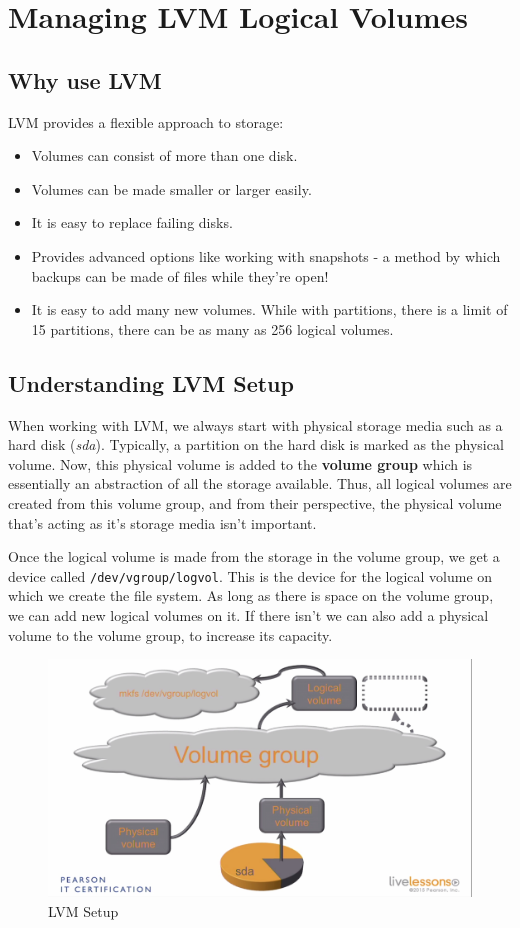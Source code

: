 \chapter{Managing LVM Logical Volumes}

\section{Why use LVM}
LVM provides a flexible approach to storage:

\vspace{-10pt}
\begin{itemize}
	\item Volumes can consist of more than one disk.
	\item Volumes can be made smaller or larger easily.
	\item It is easy to replace failing disks.
	\item Provides advanced options like working with snapshots - a method by which backups can be made of files while they're open!
	\item It is easy to add many new volumes. While with partitions, there is a limit of 15 partitions, there can be as many as 256 logical volumes. 
\end{itemize}

\section{Understanding LVM Setup}
When working with LVM, we always start with physical storage media such as a hard disk (\textit{sda}). Typically, a partition on the hard disk is marked as the physical volume. Now, this physical volume is added to the \textbf{volume group} which is essentially an abstraction of all the storage available. Thus, all logical volumes are created from this volume group, and from their perspective, the physical volume that's acting as it's storage media isn't important. 

Once the logical volume is made from the storage in the volume group, we get a device called \verb|/dev/vgroup/logvol|. This is the device for the logical volume on which we create the file system. As long as there is space on the volume group, we can add new logical volumes on it. If there isn't we can also add a physical volume to the volume group, to increase its capacity. 

\begin{figure}[H]
	\centering
	\includegraphics[width=0.9\linewidth]{RHCSA/Mod2/chapters/2.16.a}
	\caption{LVM Setup}
	\label{fig:2 LVM Setup}
\end{figure}

